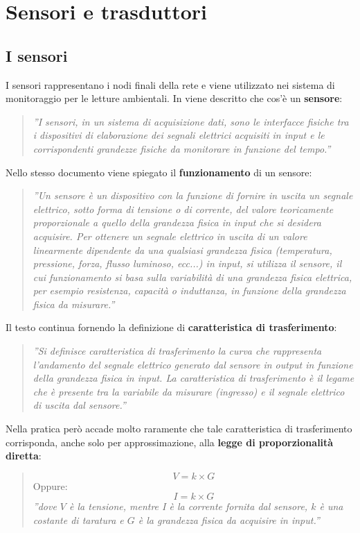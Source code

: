 \documentclass[a4paper]{report} %
\begin{document}
\chapter{Sensori e trasduttori}

\section{I sensori}
I sensori rappresentano i nodi finali della rete e viene utilizzato nei sistema di monitoraggio per le letture ambientali.
In \cite{art:rif.1} viene descritto che cos'è un \textbf{sensore}:
\begin{quote}
	\textit{''I sensori, in un sistema di acquisizione dati, sono le interfacce fisiche tra i dispositivi di elaborazione dei segnali elettrici acquisiti in input e le corrispondenti grandezze fisiche da monitorare in funzione del tempo.''}
\end{quote} 
Nello stesso documento viene spiegato il \textbf{funzionamento} di un sensore:
\begin{quote}
	\textit{''Un sensore è un dispositivo con la funzione di fornire in uscita un segnale elettrico, sotto forma di tensione o di corrente, del valore teoricamente proporzionale a quello della grandezza fisica in input che si desidera acquisire. 	
	Per ottenere un segnale elettrico in uscita di un valore linearmente dipendente da una qualsiasi grandezza fisica (temperatura, pressione, forza, flusso luminoso, ecc...) in input, si utilizza il sensore, il cui funzionamento si basa sulla variabilità di una grandezza fisica elettrica, per esempio resistenza, capacità o induttanza, in funzione della grandezza fisica da misurare.''}
\end{quote}
Il testo continua fornendo la definizione di \textbf{caratteristica di trasferimento}:	
\begin{quote}
	\textit{''Si definisce caratteristica di trasferimento la curva che rappresenta l'andamento del segnale elettrico generato dal sensore in output in funzione della grandezza fisica in input.
	La caratteristica di trasferimento è il legame che è presente tra la variabile da misurare (ingresso) e il segnale elettrico di uscita dal sensore.''}
\end{quote}
Nella pratica però accade molto raramente che tale caratteristica di trasferimento corrisponda, anche solo per approssimazione, alla \textbf{legge di proporzionalità diretta}: 
\begin{quote}
	\begin{equation}
	V = k \times G
	\end{equation}
	Oppure:
	\begin{equation}
	I = k \times G
	\end{equation}
	\textit{''dove $V$ è la tensione, mentre I è la corrente fornita dal sensore, $k$ è una costante di taratura e $G$ è la grandezza fisica da acquisire in input.''} 
\end{quote} 
\end{document}
